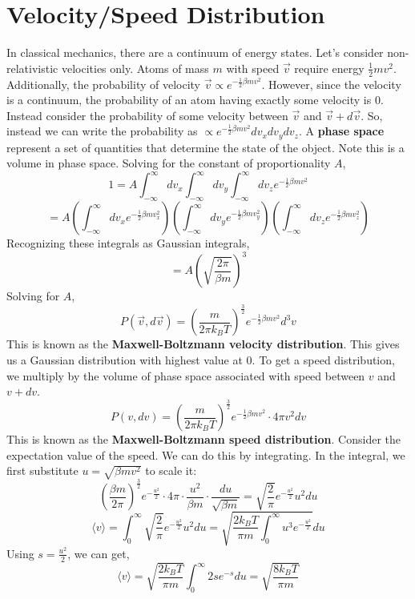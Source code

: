 \documentclass[../main.tex]{subfiles}
\newcommand{\expect}[1]{{\langle #1 \rangle}}
\begin{document}
\section{Velocity/Speed Distribution}
In classical mechanics, there are a continuum of energy states. Let's consider non-relativistic velocities only.
Atoms of mass $m$ with speed $\vec{v}$ require energy $\frac{1}{2}mv^{2}$. Additionally, the probability of velocity
$\vec{v}\propto e^{-\frac{1}{2}\beta mv^{2} }$. However, since the velocity is a continuum, the probability of an atom
having exactly some velocity is $0$. Instead consider the probability of some velocity between $\vec{v}$ and $\vec{v}+d\vec{v}$.
So, instead we can write the probability as $\propto e^{-\frac{1}{2}\beta mv^{2}}dv_{x}dv_{y}dv_{z}$. A \textbf{phase space} represent
a set of quantities that determine the state of the object. Note this is a volume in phase space. Solving for the constant 
of proportionality $A$,
$$1=A\int_{-\infty}^{\infty}dv_{x}\int_{-\infty}^{\infty}dv_{y}
\int_{-\infty}^{\infty}dv_{z}e^{-\frac{1}{2}\beta mv^{2}}$$
$$=A\left(\int_{-\infty}^{\infty}dv_{x}e^{-\frac{1}{2}\beta mv_{x}^{2}}\right)
\left(\int_{-\infty}^{\infty}dv_{y}e^{-\frac{1}{2}\beta mv_{y}^{2}}\right)
\left(\int_{-\infty}^{\infty}dv_{z}e^{-\frac{1}{2}\beta mv_{z}^{2}}\right)$$
Recognizing these integrals as Gaussian integrals,
$$=A\left(\sqrt{\frac{2\pi}{\beta m}}\right)^{3}$$
Solving for $A$,
$$\boxed{P(\vec{v},d\vec{v})=\left(\frac{m}{2\pi k_{B}T}\right)^{\frac{3}{2}}e^{-\frac{1}{2}\beta mv^{2}}d^{3}v}$$
This is known as the \textbf{Maxwell-Boltzmann velocity distribution}.
This gives us a Gaussian distribution with highest value at $0$.
To get a speed distribution, we multiply by the volume of phase space
associated with speed between $v$ and $v+dv$.
$$\boxed{P(v,dv)=\left(\frac{m}{2\pi k_{B}T}\right)^{\frac{3}{2}}e^{-\frac{1}{2}\beta mv^{2}}\cdot 4\pi v^{2}dv}$$
This is known as the \textbf{Maxwell-Boltzmann speed distribution}.
Consider the expectation value of the speed. We can do this by integrating. In the integral, we first substitute $u=\sqrt{\beta mv^{2}}$
to scale it:
$$\left(\frac{\beta m}{2\pi}\right)^{\frac{3}{2}}e^{-\frac{u^{2}}{2}}\cdot 4\pi\cdot\frac{u^{2}}{\beta m}\cdot\frac{du}{\sqrt{\beta m}}
=\sqrt{\frac{2}{\pi}}e^{-\frac{u^{2}}{2}}u^{2}du
$$
$$\expect{v}=\int_{0}^{\infty}\sqrt{\frac{2}{\pi}}e^{-\frac{u^{2}}{2}}u^{2}du
=\sqrt{\frac{2k_{B}T}{\pi m}\int_{0}^{\infty}u^{3}e^{-\frac{u^{2}}{2}}}du$$
Using $s=\frac{u^{2}}{2}$, we can get,
$$\expect{v}=\sqrt{\frac{2k_{B}T}{\pi m}}\int_{0}^{\infty}2se^{-s}du
=\boxed{\sqrt{\frac{8k_{B}T}{\pi m}}}$$
\end{document}

